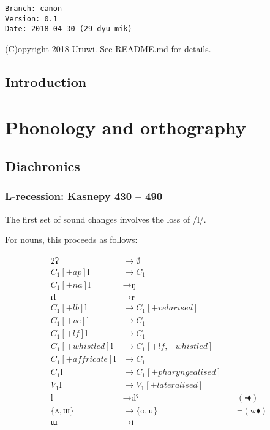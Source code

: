 \documentclass{book}
\begin{document}
\begin{verbatim}
Branch: canon
Version: 0.1
Date: 2018-04-30 (29 dyu mik)
\end{verbatim}

(C)opyright 2018 Uruwi. See README.md for details.

\tableofcontents

\section{Introduction}

\chapter{Phonology and orthography}

\section{Diachronics}

\subsection{L-recession: Kasnepy 430 -- 490}

The first set of sound changes involves the loss of /l/.

For nouns, this proceeds as follows:

\begin{alignat*}{2}
  \text{ʔ} &\rightarrow \emptyset \\
  C_1[+ap] \text{l} &\rightarrow C_1 \\
  C_1[+na] \text{l} &\rightarrow \text{ŋ} \\
  \text{ɾl} &\rightarrow \text{r} \\
  C_1[+lb] \text{l} &\rightarrow C_1[+velarised] \\
  C_1[+ve] \text{l} &\rightarrow C_1 \\
  C_1[+lf] \text{l} &\rightarrow C_1 \\
  C_1[+whistled] \text{l} &\rightarrow C_1[+lf, -whistled] \\
  C_1[+affricate] \text{l} &\rightarrow C_1 \\
  C_1 \text{l} &\rightarrow C_1[+pharyngealised] \\
  V_1 \text{l} &\rightarrow V_1[+lateralised] \\
  \text{l} &\rightarrow \text{dˤ}  &\quad(\square \blacklozenge) \\
  \{\text{ʌ}, \text{ɯ}\} &\rightarrow \{\text{o}, \text{u}\} &\quad \lnot(\text{w} \blacklozenge) \\
  \text{ɯ} &\rightarrow \text{i}
\end{alignat*}
\end{document}
